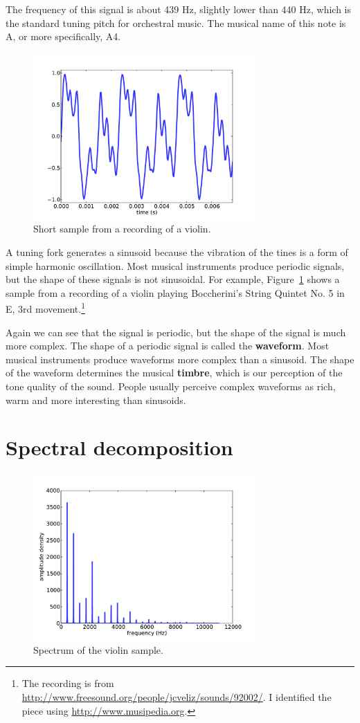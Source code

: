 \documentclass[12pt]{book}
\begin{document}
The frequency of this signal is about 439 Hz, slightly lower than
440 Hz, which is the standard tuning pitch for orchestral music.  The
musical name of this note is A, or more specifically, A4.

\begin{figure}
\centerline{\includegraphics[height=2.5in]{figs/violin1.pdf}}
\caption{Short sample from a recording of a violin.}
\label{fig.violin1}
\end{figure}

A tuning fork generates a sinusoid because the vibration of the tines
is a form of simple harmonic oscillation.  Most musical instruments
produce periodic signals, but the shape of these signals is not
sinusoidal.  For example, Figure~\ref{fig.violin1} shows a sample
from a recording of a violin playing
Boccherini's String Quintet No. 5 in E, 3rd
movement.\footnote{The recording is from
  \url{http://www.freesound.org/people/jcveliz/sounds/92002/}.
I identified the piece using \url{http://www.musipedia.org}.}

Again we can see that the signal is periodic, but the shape of the
signal is much more complex.  The shape of a periodic signal is called
the {\bf waveform}.  Most musical instruments produce waveforms more
complex than a sinusoid.  The shape of the waveform determines the
musical {\bf timbre}, which is our perception of the tone quality of the
sound.  People usually perceive complex waveforms as rich, warm and
more interesting than sinusoids.


\section{Spectral decomposition}

\begin{figure}
\centerline{\includegraphics[height=2.5in]{figs/violin2.pdf}}
\caption{Spectrum of the violin sample.}
\label{fig.violin2}
\end{figure}
\end{document}
